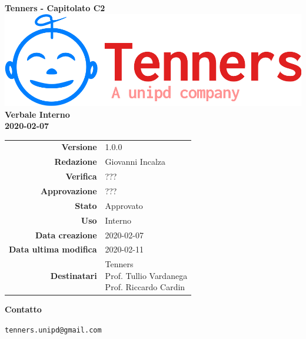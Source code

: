 \begin{titlepage}
	\begin{center}
		\large \textbf{Tenners - Capitolato C2}
		\vfill
		\includegraphics[scale = 0.3]{./res/img/logo.png}\\
		\vfill
		\Huge \textbf{Verbale Interno} \\
		\textbf {2020-02-07}

        \vfill
        \large

        \begin{tabular}{r|l}
                        \textbf{Versione} & 1.0.0 \\
                        \textbf{Redazione} & Giovanni Incalza \\
                        \textbf{Verifica} &  ??? \\
                        \textbf{Approvazione} & ??? \\
                        \textbf{Stato} & Approvato \\
                        \textbf{Uso} &  Interno\\
                        \textbf{Data creazione} &  2020-02-07\\
                        \textbf{Data ultima modifica} &  2020-02-11\\
                        \textbf{Destinatari} & \parbox[t]{5cm}{Tenners \\ Prof. Tullio Vardanega\\ Prof. Riccardo Cardin}
                \end{tabular}
                \vfill
                \normalsize
                \vfill
                \textbf{Contatto}

                \texttt{tenners.unipd@gmail.com}

	\end{center}
\end{titlepage}
